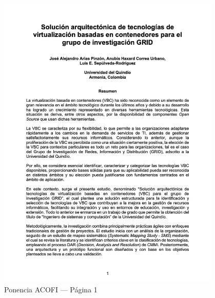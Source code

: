 \begin{figure}[H]
    \centering
    \begin{tcolorbox}[
        colback=white,
        colframe=gray!50,
        boxrule=1pt,
        arc=2pt,
        boxsep=5pt,
        left=3pt,
        right=3pt,
        top=3pt,
        bottom=3pt,
        drop shadow
    ]
        \includegraphics[width=0.95\textwidth,keepaspectratio]{apendices/ACOFI/pagina_1.png}
    \end{tcolorbox}
    \caption{Ponencia ACOFI --- Página 1}\label{fig:acofi-pagina-1}
\end{figure}
\FloatBarrier%
